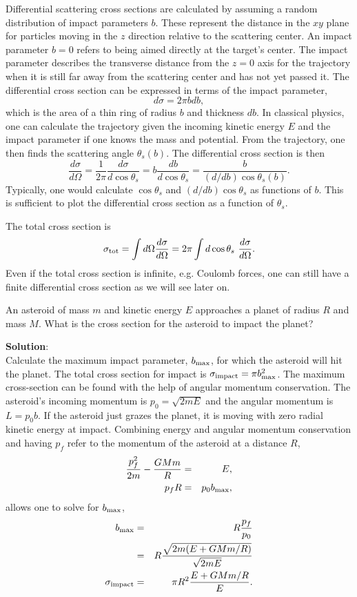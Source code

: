 Differential scattering cross sections are calculated by assuming a random distribution of impact parameters $b$. These represent the distance in the $xy$ plane for particles moving in the $z$ direction relative to the scattering center. An impact parameter $b=0$ refers to being aimed directly at the target's center. The impact parameter describes the transverse distance from the $z=0$ axis for the trajectory when it is still far away from the scattering center and has not yet passed it. The differential cross section can be expressed in terms of the impact parameter,
\begin{equation}
d\sigma=2\pi bdb,
\end{equation}
which is the area of a thin ring of radius $b$ and thickness $db$. In classical physics, one can calculate the trajectory given the incoming kinetic energy $E$ and the impact parameter if one knows the mass and potential. From the trajectory, one then finds the scattering angle $\theta_s(b)$. The differential cross section is then
\begin{equation}
\frac{d\sigma}{d\Omega}=\frac{1}{2\pi}\frac{d\sigma}{d\cos\theta_s}=b\frac{db}{d\cos\theta_s}=\frac{b}{(d/db)\cos\theta_s(b)}.
\end{equation}
Typically, one would calculate $\cos\theta_s$ and $(d/db)\cos\theta_s$ as functions of $b$. This is sufficient to plot the differential cross section as a function of $\theta_s$.

The total cross section is 
\begin{equation}
\sigma_{\rm tot}=\int d\Omega\frac{d\sigma}{d\Omega}=2\pi\int d\cos\theta_s~\frac{d\sigma}{d\Omega}. 
\end{equation}
Even if the total cross section is infinite, e.g. Coulomb forces, one can still have a finite differential cross section as we will see later on.

\example
An asteroid of mass $m$ and kinetic energy $E$ approaches a planet of radius $R$ and mass $M$. What is the cross section for the asteroid to impact the planet?

{\bf Solution}:\\
Calculate the maximum impact parameter, $b_{\rm max}$, for which the asteroid will hit the planet. The total cross  section for impact is $\sigma_{\rm impact}=\pi b_{\rm max}^2$. The maximum cross-section can be found with the help of angular momentum conservation. The asteroid's incoming momentum is $p_0=\sqrt{2mE}$ and the angular momentum is $L=p_0b$. If the asteroid just grazes the planet, it is moving with zero radial kinetic energy at impact. Combining energy and angular momentum conservation and having $p_f$ refer to the momentum of the asteroid at a distance $R$,
\begin{eqnarray*}
\frac{p_f^2}{2m}-\frac{GMm}{R}&=&E,\\
p_fR&=&p_0b_{\rm max},
\end{eqnarray*}
allows one to solve for $b_{\rm max}$,
\begin{eqnarray*}
b_{\rm max}&=&R\frac{p_f}{p_0}\\
&=&R\frac{\sqrt{2m(E+GMm/R)}}{\sqrt{2mE}}\\
\sigma_{\rm impact}&=&\pi R^2\frac{E+GMm/R}{E}.
\end{eqnarray*}
\exampleend


